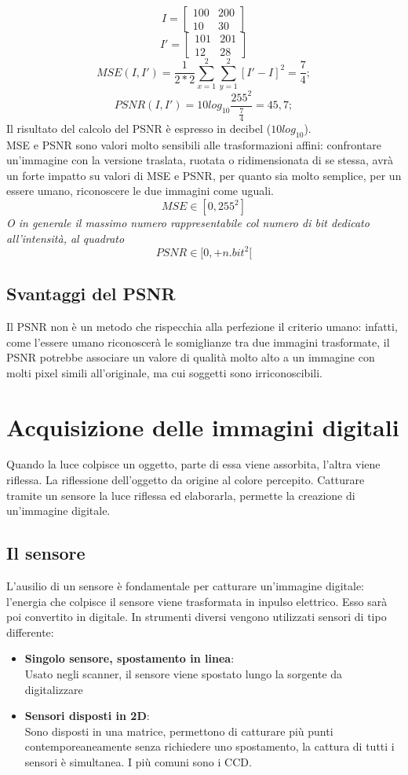 \documentclass{report}
\begin{document}
$$
I =
\begin{bmatrix}
	100 & 200 \\
	10  & 30  
\end{bmatrix}
$$
$$
I' =
\begin{bmatrix}
	101 & 201 \\
	12  & 28  
\end{bmatrix}
$$
$$
MSE(I, I') = \frac{1}{2*2}\sum^2_{x=1}\sum^2_{y=1}[I' - I]^2 = \frac{7}{4};
$$
$$
PSNR(I, I') = 10log_{10}\frac{255^2}{\frac{7}{4}} = 45,7;
$$
Il risultato del calcolo del PSNR è espresso in decibel ($10log_{10}$).\\
MSE e PSNR sono valori molto sensibili alle trasformazioni affini: confrontare un'immagine con la versione traslata, ruotata o ridimensionata di se stessa, avrà un forte impatto su valori di MSE e PSNR, per quanto sia molto semplice, per un essere umano, riconoscere le due immagini come uguali.
$$
MSE \in [0, 255^2] 
$$
\textit{O in generale il massimo numero rappresentabile col numero di bit dedicato all'intensità, al quadrato}
$$
PSNR \in [0, +n.bit^2[
	$$
	
	\section{Svantaggi del PSNR}
	Il PSNR non è un metodo che rispecchia alla perfezione il criterio umano: infatti, come l'essere umano riconoscerà le somiglianze tra due immagini trasformate, il PSNR potrebbe associare un valore di qualità molto alto a un immagine con molti pixel simili all'originale, ma cui soggetti sono irriconoscibili.
	
	\newpage
	\chapter{Acquisizione delle immagini digitali}
	Quando la luce colpisce un oggetto, parte di essa viene assorbita, l'altra viene riflessa. La riflessione dell'oggetto da origine al colore percepito. Catturare tramite un sensore la luce riflessa ed elaborarla, permette la creazione di un'immagine digitale.
	
	\section{Il sensore}
	L'ausilio di un sensore è fondamentale per catturare un'immagine digitale:\\
	l'energia che colpisce il sensore viene trasformata in inpulso elettrico. Esso sarà poi convertito in digitale.
	In strumenti diversi vengono utilizzati sensori di tipo differente:
	\begin{itemize}
		\item \textbf{Singolo sensore, spostamento in linea}:\\
		      Usato negli scanner, il sensore viene spostato lungo la sorgente da digitalizzare
		\item \textbf{Sensori disposti in 2D}:\\
		      Sono disposti in una matrice, permettono di catturare più punti contemporeaneamente senza richiedere uno spostamento, la cattura di tutti i sensori è simultanea. I più comuni sono i CCD.
	\end{itemize}
\end{document}
